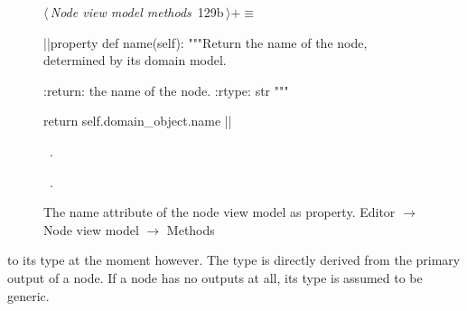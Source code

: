 \documentclass[%
    a4paper,    %
    justified,  %
    nobib,      %
    openany     %
]{tufte-book}
\makeatletter
\renewcommand{\label}[1]{\@tufte@label{##1}}%
\makeatother
\begin{document}
\begin{figure}[!htbp]
\begin{flushleft} \small
\begin{minipage}{\linewidth}\label{scrap70}\raggedright\small
{} $\langle\,${\itshape Node view model methods}\nobreak\ {\footnotesize {129b}}$\,\rangle+\equiv$
\vspace{-1ex}
\begin{pythoncode}
|\normalfont{}\fontfamily{}|property
def name(self):
    """Return the name of the node, determined by its domain model.

    :return: the name of the node.
    :rtype: str
    """

    return self.domain_object.name
|\NWsep|
\end{pythoncode}
\vspace{1.5ex}
\footnotesize
\begin{list}{}{\setlength{\itemsep}{-\parsep}\setlength{\itemindent}{-\leftmargin}}
\item \NWtxtMacroDefBy\ .
\item \NWtxtMacroRefIn\ .

\item{}
\end{list}
\end{minipage}\vspace{4ex}
\end{flushleft}
\caption{The name attribute of the node view model as property.
  \newline{}\newline{}Editor $\rightarrow$ Node view model $\rightarrow$
  Methods}
\end{figure}

 to its type at the moment
however. The type is directly derived from the primary output of a node. If a
node has no outputs at all, its type is assumed to be generic.
\end{document}
